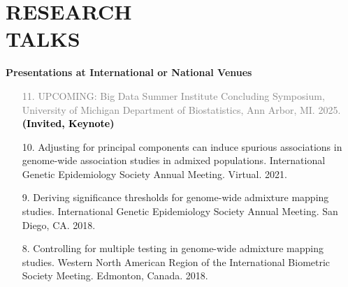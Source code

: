 \documentclass[margin]{res}
\newcommand{\annotate}[1]{\textcolor{black}{\textbf{(#1)}}}
\newcommand{\annotateItem}[1]{
	\begin{itemize} \vspace{-0.1cm}
	\item[] 
	\begin{footnotesize}\textcolor{black}{(#1)}\end{footnotesize}
	\end{itemize} \vspace{-0.1cm}
}
\begin{document}
\begin{resume}
\begin{itemize}
\end{itemize}



\section{RESEARCH \\TALKS}

\textbf{Presentations at International or National Venues}

\begin{itemize}

\item[\textcolor{gray}{11.}] \textcolor{gray}{UPCOMING: 
Big Data Summer Institute Concluding Symposium, University of Michigan Department of Biostatistics, Ann Arbor, MI. 2025. 
\annotate{Invited, Keynote}}
	
\item[10.] Adjusting for principal components can induce spurious associations in genome-wide association studies in admixed populations. 
International Genetic Epidemiology Society Annual Meeting. Virtual. 2021. %
	
\item[9.] Deriving significance thresholds for genome-wide admixture mapping studies. 
International Genetic Epidemiology Society Annual Meeting. San Diego, CA. 2018. 

\item[8.] Controlling for multiple testing in genome-wide admixture mapping studies. 
Western North American Region of the International Biometric Society Meeting. Edmonton, Canada. 2018. %
	

\end{itemize}
\end{resume}
\end{document}
